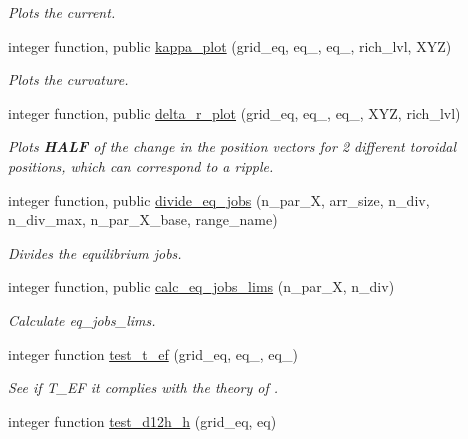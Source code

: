 \begin{DoxyCompactItemize}
\begin{DoxyCompactList}\small\item\em Plots the current. \end{DoxyCompactList}\item 
integer function, public \hyperlink{namespaceeq__ops_ad173efd111cb85c11bc2bc78a7555096}{kappa\+\_\+plot} (grid\+\_\+eq, eq\+\_, eq\+\_, rich\+\_\+lvl, X\+YZ)
\begin{DoxyCompactList}\small\item\em Plots the curvature. \end{DoxyCompactList}\item 
integer function, public \hyperlink{namespaceeq__ops_ac0a79893900631d25b170be0abd2c131}{delta\+\_\+r\+\_\+plot} (grid\+\_\+eq, eq\+\_, eq\+\_, X\+YZ, rich\+\_\+lvl)
\begin{DoxyCompactList}\small\item\em Plots {\bfseries H\+A\+LF} of the change in the position vectors for 2 different toroidal positions, which can correspond to a ripple. \end{DoxyCompactList}\item 
integer function, public \hyperlink{namespaceeq__ops_a8fae749abe55865d8135fef536a8e8f1}{divide\+\_\+eq\+\_\+jobs} (n\+\_\+par\+\_\+X, arr\+\_\+size, n\+\_\+div, n\+\_\+div\+\_\+max, n\+\_\+par\+\_\+\+X\+\_\+base, range\+\_\+name)
\begin{DoxyCompactList}\small\item\em Divides the equilibrium jobs. \end{DoxyCompactList}\item 
integer function, public \hyperlink{namespaceeq__ops_a4e20b8725fce149449f83754244dc84e}{calc\+\_\+eq\+\_\+jobs\+\_\+lims} (n\+\_\+par\+\_\+X, n\+\_\+div)
\begin{DoxyCompactList}\small\item\em Calculate {\ttfamily eq\+\_\+jobs\+\_\+lims}. \end{DoxyCompactList}\item 
integer function \hyperlink{namespaceeq__ops_a1f5049c3e309fa23ee46fd116c9344f1}{test\+\_\+t\+\_\+ef} (grid\+\_\+eq, eq\+\_, eq\+\_)
\begin{DoxyCompactList}\small\item\em See if {\ttfamily T\+\_\+\+EF} it complies with the theory of \cite{Weyens3D}. \end{DoxyCompactList}\item 
integer function \hyperlink{namespaceeq__ops_a003df1e1ab90dc6f586c3eed3dd067e8}{test\+\_\+d12h\+\_\+h} (grid\+\_\+eq, eq)

\end{DoxyCompactItemize}
